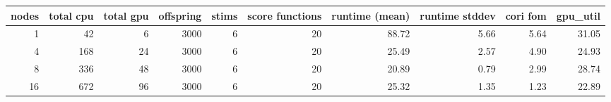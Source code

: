\begin{tabular}{rrrrrrrrrr}
\toprule
 nodes &  total cpu &  total gpu &  offspring &  stims &  score functions & runtime (mean) & runtime stddev & cori fom & gpu\_util \\
\midrule
     1 &         42 &          6 &       3000 &      6 &               20 &          88.72 &           5.66 &     5.64 &    31.05 \\
     4 &        168 &         24 &       3000 &      6 &               20 &          25.49 &           2.57 &     4.90 &    24.93 \\
     8 &        336 &         48 &       3000 &      6 &               20 &          20.89 &           0.79 &     2.99 &    28.74 \\
    16 &        672 &         96 &       3000 &      6 &               20 &          25.32 &           1.35 &     1.23 &    22.89 \\
\bottomrule
\end{tabular}
